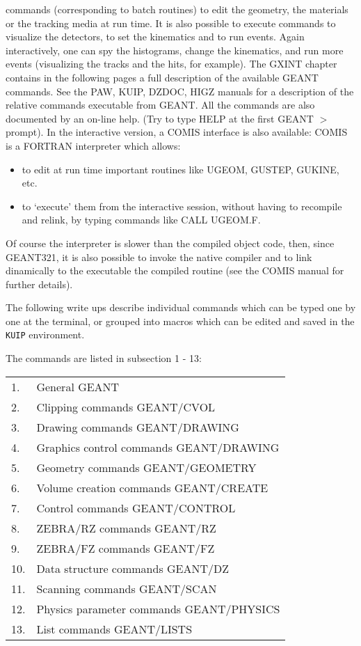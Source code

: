 commands (corresponding to batch routines) to edit the geometry, the materials
or the tracking media at run time. It is also possible to execute commands
to visualize the detectors, to set the kinematics and to run events. Again
interactively, one can spy the histograms, change the kinematics, and run
more events (visualizing the tracks and the hits, for example). The GXINT
chapter contains in the following pages a full description of the available
GEANT commands. See the PAW, KUIP, DZDOC, HIGZ manuals for a description of
the relative commands executable from GEANT. All the commands are also
documented by an on-line help. (Try to type HELP at the first GEANT $>$ prompt).
In the interactive version, a COMIS interface is also available: COMIS is a
FORTRAN interpreter which allows:
\begin{itemize}
\item to edit at run time important routines like UGEOM, GUSTEP, GUKINE, etc.
\item to `execute' them from the interactive session, without having to 
      recompile and relink, by typing commands like CALL UGEOM.F.
\end{itemize}
Of course the interpreter is slower than the compiled object code,
then, since GEANT321, it is also possible to invoke the native compiler and
to link dinamically to the executable the compiled routine (see the COMIS 
manual for further details).


The following write ups describe individual commands which can be typed
one by one at the terminal, or grouped into macros which can be edited
and saved in the {\tt KUIP} environment.

The commands are listed in subsection 1 - 13:

\begin{center}\begin{tabular}{ll}
1. &  General GEANT \\
2. & Clipping commands GEANT/CVOL \\
3. & Drawing commands GEANT/DRAWING \\
4. & Graphics control commands GEANT/DRAWING \\
5. & Geometry commands GEANT/GEOMETRY \\
6. & Volume creation commands GEANT/CREATE \\
7. & Control commands GEANT/CONTROL \\
8. & ZEBRA/RZ commands GEANT/RZ \\
9. & ZEBRA/FZ commands GEANT/FZ \\
10. & Data structure commands GEANT/DZ \\
11. & Scanning commands GEANT/SCAN \\
12. & Physics parameter commands GEANT/PHYSICS \\
13. & List commands GEANT/LISTS \\
\end{tabular}\end{center}

